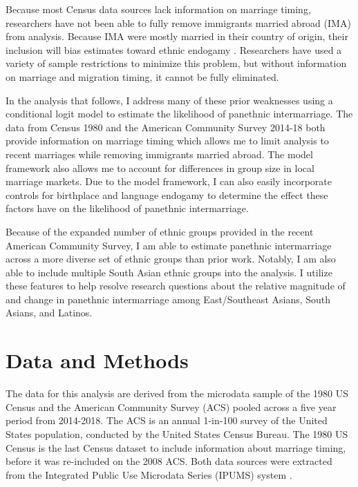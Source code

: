 \documentclass[11pt,]{article}
\begin{document}
Because most Census data sources lack information on marriage timing, researchers have not been able to fully remove immigrants married abroad (IMA) from analysis. Because IMA were mostly married in their country of origin, their inclusion will bias estimates toward ethnic endogamy \citep{hwang_problem_1990}. Researchers have used a variety of sample restrictions to minimize this problem, but without information on marriage and migration timing, it cannot be fully eliminated.

In the analysis that follows, I address many of these prior weaknesses using a conditional logit model to estimate the likelihood of panethnic intermarriage. The data from Census 1980 and the American Community Survey 2014-18 both provide information on marriage timing which allows me to limit analysis to recent marriages while removing immigrants married abroad. The model framework also allows me to account for differences in group size in local marriage markets. Due to the model framework, I can also easily incorporate controls for birthplace and language endogamy to determine the effect these factors have on the likelihood of panethnic intermarriage.

Because of the expanded number of ethnic groups provided in the recent American Community Survey, I am able to estimate panethnic intermarriage across a more diverse set of ethnic groups than prior work. Notably, I am also able to include multiple South Asian ethnic groups into the analysis. I utilize these features to help resolve research questions about the relative magnitude of and change in panethnic intermarriage among East/Southeast Asians, South Asians, and Latinos.

\hypertarget{data-and-methods}{%
\section{Data and Methods}\label{data-and-methods}}

The data for this analysis are derived from the microdata sample of the 1980 US Census and the American Community Survey (ACS) pooled across a five year period from 2014-2018. The ACS is an annual 1-in-100 survey of the United States population, conducted by the United States Census Bureau. The 1980 US Census is the last Census dataset to include information about marriage timing, before it was re-included on the 2008 ACS. Both data sources were extracted from the Integrated Public Use Microdata Series (IPUMS) system \citep{ruggles_ipums_2020}.
\end{document}

